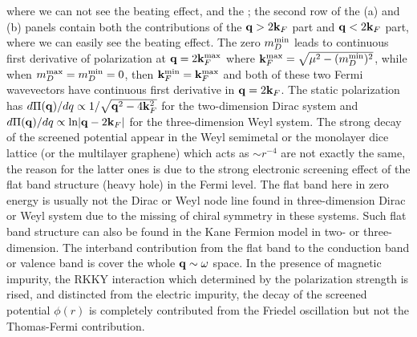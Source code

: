 \documentclass[UTF8,a4paper]{article}
\begin{document}
\begin{large}
where we can not see the beating effect, and the ;
the second row of the (a) and (b) panels contain both the contributions of the ${\bf q}>2{\bf k}_{F}$ part and ${\bf q}<2{\bf k}_{F}$ part,
where we can easily see the beating effect.
The zero $m_{D}^{{\rm min}}$ leads to continuous first derivative 
of polarization at ${\bf q}=2{\bf k}_{F}^{{\rm max}}$ where ${\bf k}_{F}^{{\rm max}}=\sqrt{\mu^{2}-(m_{D}^{{\rm min}})^{2}}$,
while when $m_{D}^{{\rm max}}=m_{D}^{{\rm min}}=0$, then ${\bf k}_{F}^{{\rm min}}={\bf k}_{F}^{{\rm max}}$
and both of these two Fermi wavevectors have continuous first derivative in ${\bf q}=2{\bf k}_{F}$.
The static polarization has $d\Pi({\bf q})/dq\propto 1/\sqrt{{\bf q}^{2}-4{\bf k}_{F}^{2}}$ for the two-dimension Dirac system\cite{Hwang E H2}
and $d\Pi({\bf q})/dq\propto {\rm ln}|{\bf q}-2{\bf k}_{F}|$ for the three-dimension Weyl system\cite{Lv M}.
The strong decay of the screened potential appear in the Weyl semimetal or the monolayer dice lattice (or the multilayer graphene\cite{Koshino M})
which acts as $\sim r^{-4}$
are not exactly the same,
the reason for the latter ones is due to the strong electronic screening effect of the flat band structure (heavy hole) in the Fermi level.
The flat band here in zero energy is usually not the Dirac or Weyl node line found in three-dimension Dirac or Weyl system
due to the missing of chiral symmetry in these systems.
Such flat band structure can also be found in the Kane Fermion model in two- or three-dimension\cite{Malcolm J D2}.
The interband contribution from the flat band to the conduction band or valence band is cover the whole ${\bf q}\sim\omega$ space\cite{Malcolm J D}. 
In the presence of magnetic impurity, the RKKY interaction which determined by the polarization strength is rised,
and distincted from the electric impurity, the decay of the screened potential $\phi(r)$ is completely contributed from the 
Friedel oscillation but not the Thomas-Fermi contribution.



\end{large}
\end{document}
